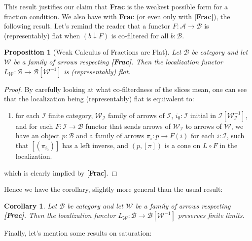 \documentclass{article}
\numberwithin{equation}{section}
\theoremstyle{definition}
\theoremstyle{plain}
\newtheorem{proposition}[equation]{Proposition}
\newtheorem{corollary}[equation]{Corollary}
\begin{document}
This result justifies our claim that \textbf{Frac} is the weakest possible form for a fraction condition. We also have with \textbf{Frac} (or even only with \textbf{[Frac]}), the following result. Let's remind the reader that a functor $F:\mathcal{A} \to \mathcal{B}$ is (representably) flat when $(b \downarrow F)$ is co-filtered for all $b:\mathcal{B}$.

\begin{proposition}[Weak Calculus of Fractions are Flat] Let $\mathcal{B}$ be category and let $\mathcal{W}$ be a family of arrows respecting \textbf{[Frac]}. Then the localization functor $L_{\mathcal{W}}: \mathcal{B} \to \mathcal{B}[\mathcal{W}^{-1}]$ is (representably) flat.
\end{proposition}
\begin{proof}
	By carefully looking at what co-filterdness of the slices mean, one can see that the localization being (representably) flat is equivalent to:
	\begin{enumerate}
		\item[\textbf{Flat:}] for each $\mathcal{I}$ finite category, $\mathcal{W}_{\mathcal{I}}$ family of arrows of $\mathcal{I}$, $i_0:\mathcal{I}$ initial in $\mathcal{I}[\mathcal{W}_{\mathcal{I}}^{-1}]$, and for each $F:\mathcal{I} \to \mathcal{B}$ functor that sends arrows of $\mathcal{W}_{\mathcal{I}}$ to arrows of $\mathcal{W}$, we have an object $p:\mathcal{B}$ and a family of arrows $\pi_i:p \to F(i)$ for each $i:\mathcal{I}$, such that $[(\pi_{i_0})]$ has a left inverse, and $(p,[\pi])$ is a cone on $L_{\mathcal{}}\circ F$ in the localization.
	\end{enumerate}
	which is clearly implied by \textbf{[Frac]}.
\end{proof}

Hence we have the corollary, slightly more general than the usual result:

\begin{corollary} Let $\mathcal{B}$ be category and let $\mathcal{W}$ be a family of arrows respecting \textbf{[Frac]}. Then the localization functor $L_{\mathcal{W}}:\mathcal{B} \to \mathcal{B}[\mathcal{W}^{-1}]$ preserves finite limits.
\end{corollary}

Finally, let's mention some results on saturation:
\end{document}
